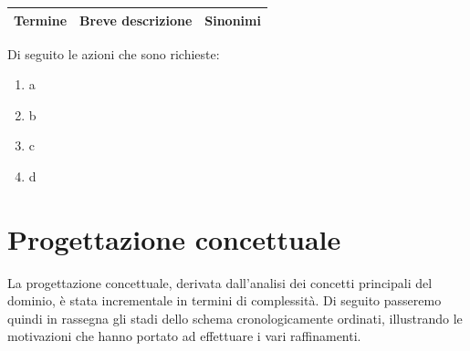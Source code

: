 \documentclass[a4paper,12pt]{report}
\begin{document}
            \begin{center}
                 \begin{tabular}{|c c c|} 
                     \hline
                     Termine & Breve descrizione & Sinonimi \\ [0.5ex] 
                     \hline
                \end{tabular}
            \end{center}
            
            Di seguito le azioni che sono richieste:
            
            \begin{enumerate}
              \item a
              \item b
              \item c
              \item d
              
            \end{enumerate}


	\chapter{Progettazione concettuale}
        La progettazione concettuale, derivata dall'analisi dei concetti principali del dominio,
        è stata incrementale in termini di complessità. Di seguito passeremo quindi in rassegna
        gli stadi dello schema cronologicamente ordinati, illustrando le motivazioni che hanno 
        portato ad effettuare i vari raffinamenti. 
\end{document}
